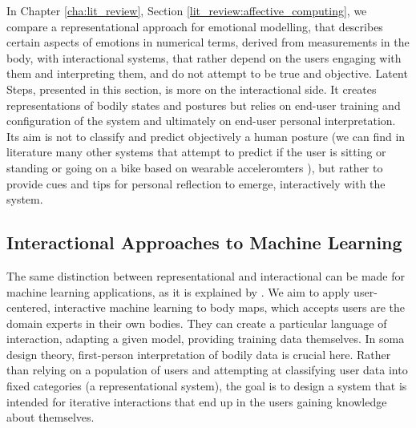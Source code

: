 
In Chapter \ref{cha:lit_review}, Section \ref{lit_review:affective_computing}, we compare a representational approach for emotional modelling, that describes certain aspects of emotions in numerical terms, derived from measurements in the body, with interactional systems, that rather depend on the users engaging with them and interpreting them, and do not attempt to be true and objective. Latent Steps, presented in this section, is more on the interactional side. It creates representations of bodily states and postures but relies on end-user training and configuration of the system and ultimately on end-user personal interpretation. Its aim is not to classify and predict objectively a human posture (we can find in literature many other systems that attempt to predict if the user is sitting or standing or going on a bike based on wearable acceleromters \cite{slim_survey_2019}), but rather to provide cues and tips for personal reflection to emerge, interactively with the system.

\subsection*{Interactional Approaches to Machine Learning}

The same distinction between representational and interactional can be made for machine learning applications, as it is explained by \citeauthor{gillies_understanding_2019} \cite{gillies_understanding_2019,bishop_non-representational_2014}. We aim to apply user-centered, interactive machine learning to body maps, which accepts users are the domain experts in their own bodies. They can create a particular language of interaction, adapting a given model, providing training data themselves. In soma design theory, first-person interpretation of bodily data is crucial here. Rather than relying on a population of users and attempting at classifying user data into fixed categories (a representational system), the goal is to design a system that is intended for iterative interactions that end up in the users gaining knowledge about themselves.

